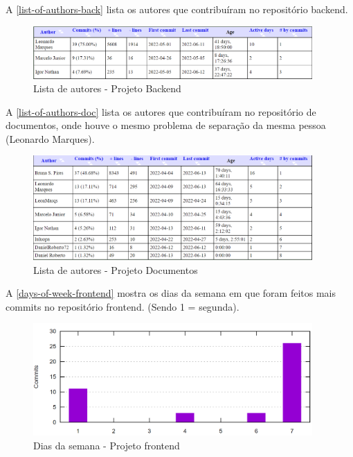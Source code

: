 A \autoref{list-of-authors-back} lista os autores que contribuíram no repositório backend.
\begin{figure}[H]
	\centering
	\caption{\label{list-of-authors-back}Lista de autores - Projeto Backend}
	\includegraphics[width=0.95\textwidth]{../imagens/stats/list-of-authors-backend.png}
\end{figure}

A \autoref{list-of-authors-doc} lista os autores que contribuíram no repositório de documentos, onde houve o mesmo problema de separação da mesma pessoa (Leonardo Marques).
\begin{figure}[H]
	\centering
	\caption{\label{list-of-authors-doc}Lista de autores - Projeto Documentos}
	\includegraphics[width=0.95\textwidth]{../imagens/stats/list-of-authors-documentos.png}
\end{figure}

A \autoref{days-of-week-frontend} mostra os dias da semana em que foram feitos mais commits no repositório \gls{frontend}. (Sendo 1 = segunda).
\begin{figure}[H]
	\centering
	\caption{\label{days-of-week-frontend}Dias da semana - Projeto \gls{frontend}}
	\includegraphics[width=0.95\textwidth]{../imagens/stats/days-of-week-frontend.png}
\end{figure}


